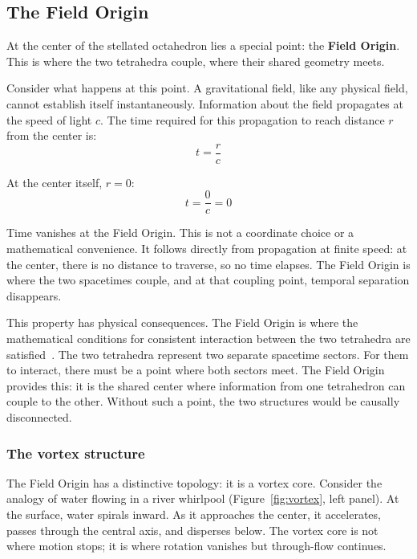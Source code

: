 \documentclass[aps,prd,preprint,superscriptaddress,showpacs,preprintnumbers,amsmath,amssymb,nofootinbib]{revtex4-2}
\begin{document}
\subsection{The Field Origin}
\label{subsec:origin}

At the center of the stellated octahedron lies a special point: the \textbf{Field Origin}. This is where the two tetrahedra couple, where their shared geometry meets.

Consider what happens at this point. A gravitational field, like any physical field, cannot establish itself instantaneously. Information about the field propagates at the speed of light $c$. The time required for this propagation to reach distance $r$ from the center is:
\begin{equation}
t = \frac{r}{c}
\end{equation}

At the center itself, $r = 0$:
\begin{equation}
t = \frac{0}{c} = 0
\end{equation}

Time vanishes at the Field Origin. This is not a coordinate choice or a mathematical convenience. It follows directly from propagation at finite speed: at the center, there is no distance to traverse, so no time elapses. The Field Origin is where the two spacetimes couple, and at that coupling point, temporal separation disappears.

This property has physical consequences. The Field Origin is where the mathematical conditions for consistent interaction between the two tetrahedra are satisfied~\cite{deffayet2013}. The two tetrahedra represent two separate spacetime sectors. For them to interact, there must be a point where both sectors meet. The Field Origin provides this: it is the shared center where information from one tetrahedron can couple to the other. Without such a point, the two structures would be causally disconnected.

\subsubsection*{The vortex structure}

The Field Origin has a distinctive topology: it is a vortex core. Consider the analogy of water flowing in a river whirlpool (Figure~\ref{fig:vortex}, left panel). At the surface, water spirals inward. As it approaches the center, it accelerates, passes through the central axis, and disperses below. The vortex core is not where motion stops; it is where rotation vanishes but through-flow continues.
\end{document}
